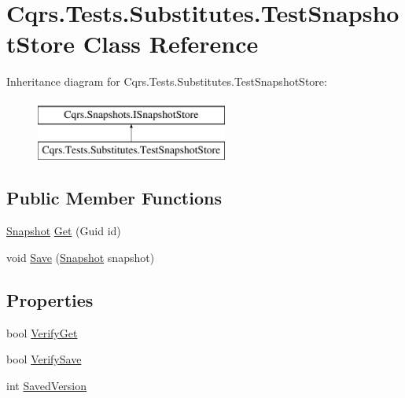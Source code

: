 \hypertarget{classCqrs_1_1Tests_1_1Substitutes_1_1TestSnapshotStore}{}\section{Cqrs.\+Tests.\+Substitutes.\+Test\+Snapshot\+Store Class Reference}
\label{classCqrs_1_1Tests_1_1Substitutes_1_1TestSnapshotStore}
Inheritance diagram for Cqrs.\+Tests.\+Substitutes.\+Test\+Snapshot\+Store\+:\begin{figure}[H]
\begin{center}
\leavevmode
\includegraphics[height=2.000000cm]{classCqrs_1_1Tests_1_1Substitutes_1_1TestSnapshotStore}
\end{center}
\end{figure}
\subsection*{Public Member Functions}
\begin{DoxyCompactItemize}
\item 
\hyperlink{classCqrs_1_1Snapshots_1_1Snapshot}{Snapshot} \hyperlink{classCqrs_1_1Tests_1_1Substitutes_1_1TestSnapshotStore_a8f07b513e21a7ed7ea0f52a41c9586ba}{Get} (Guid id)
\item 
void \hyperlink{classCqrs_1_1Tests_1_1Substitutes_1_1TestSnapshotStore_a223dbc9583120dec1469c1f84b863eae}{Save} (\hyperlink{classCqrs_1_1Snapshots_1_1Snapshot}{Snapshot} snapshot)
\end{DoxyCompactItemize}
\subsection*{Properties}
\begin{DoxyCompactItemize}
\item 
bool \hyperlink{classCqrs_1_1Tests_1_1Substitutes_1_1TestSnapshotStore_a30735e964f5ebe4502f4e3b6740b94e5}{Verify\+Get}
\item 
bool \hyperlink{classCqrs_1_1Tests_1_1Substitutes_1_1TestSnapshotStore_afcd205610fd1bcb6c02884200f1c95f4}{Verify\+Save}
\item 
int \hyperlink{classCqrs_1_1Tests_1_1Substitutes_1_1TestSnapshotStore_a6fd401fb82c4f82d32ef38c8fd964fb5}{Saved\+Version}
\end{DoxyCompactItemize}


